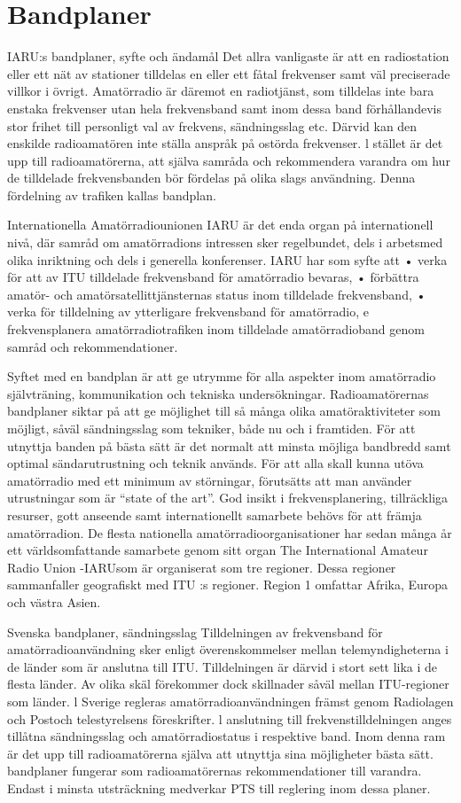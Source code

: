 \section{Bandplaner}
IARU:s bandplaner, syfte och ändamål
Det allra vanligaste är att en radiostation eller
ett nät av stationer tilldelas en eller ett fåtal
frekvenser samt väl preciserade villkor i övrigt. Amatörradio är däremot en radiotjänst,
som tilldelas inte bara enstaka frekvenser
utan hela frekvensband samt inom dessa
band förhållandevis stor frihet till personligt
val av frekvens, sändningsslag etc.
Därvid kan den enskilde radioamatören
inte ställa anspråk på ostörda frekvenser. l
stället är det upp till radioamatörerna, att
själva samråda och rekommendera varandra om hur de tilldelade frekvensbanden bör
fördelas på olika slags användning. Denna
fördelning av trafiken kallas bandplan.

Internationella Amatörradiounionen IARU är det enda organ på internationell
nivå, där samråd om amatörradions intressen sker regelbundet, dels i arbetsmed olika inriktning och dels i
generella konferenser.
IARU har som syfte att
• verka för att av ITU tilldelade frekvensband för amatörradio bevaras,
• förbättra amatör- och amatörsatellittjänsternas status inom tilldelade
frekvensband,
• verka för tilldelning av ytterligare
frekvensband för amatörradio,
e
frekvensplanera amatörradiotrafiken
inom tilldelade amatörradioband genom samråd och rekommendationer.

Syftet med en bandplan är att ge utrymme för alla aspekter inom amatörradio självträning, kommunikation och tekniska
undersökningar.
Radioamatörernas bandplaner siktar på
att ge möjlighet till så många olika amatöraktiviteter som möjligt, såväl sändningsslag
som tekniker, både nu och i framtiden. För
att utnyttja banden på bästa sätt är det normalt att minsta möjliga bandbredd samt optimal sändarutrustning och teknik används.
För att alla skall kunna utöva amatörradio
med ett minimum av störningar, förutsätts att
man använder utrustningar som är ``state of the art''.
God insikt i frekvensplanering, tillräckliga
resurser, gott anseende samt internationellt
samarbete behövs för att främja amatörradion. De flesta nationella amatörradioorganisationer har sedan många år ett världsomfattande samarbete genom sitt organ The
International Amateur Radio Union -IARUsom är organiserat som tre regioner. Dessa
regioner sammanfaller geografiskt med ITU :s
regioner. Region 1 omfattar Afrika, Europa
och västra Asien.

Svenska bandplaner, sändningsslag
Tilldelningen av frekvensband för amatörradioanvändning sker enligt överenskommelser mellan telemyndigheterna i de länder som är anslutna till ITU. Tilldelningen är
därvid i stort sett lika i de flesta länder. Av
olika skäl förekommer dock skillnader såväl
mellan ITU-regioner som länder.
l Sverige regleras amatörradioanvändningen främst genom Radiolagen och Postoch telestyrelsens föreskrifter. l anslutning
till frekvenstilldelningen anges tillåtna sändningsslag och amatörradiostatus i respektive band. Inom denna ram är det upp till
radioamatörerna själva att utnyttja sina möjligheter
bästa sätt.
bandplaner fungerar som radioamatörernas rekommendationer till varandra. Endast i minsta utsträckning medverkar
PTS till reglering inom dessa planer.

